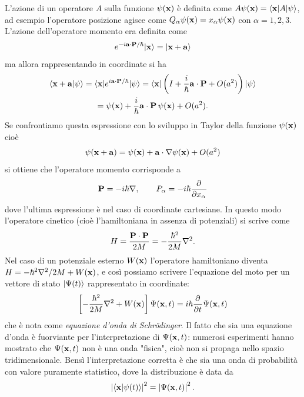 L'azione di un operatore $ A $ sulla funzione $ \psi(\mathbf{x}) $ è definita come $ A \psi(\mathbf{x}) = \langle \mathbf{x} | A | \psi \rangle $, ad esempio l'operatore posizione 
agisce come $ Q_\alpha \psi(\mathbf{x}) = x_\alpha \psi(\mathbf{x}) $ con $ \alpha = 1,2,3 $. L'azione dell'operatore momento era definita come 
\begin{align*}
  e^{- i \mathbf{a\cdot P} /\hbar } \vert \mathbf{x} \rangle = \vert \mathbf{x + a} \rangle
\end{align*}
ma allora rappresentando in coordinate si ha 
\begin{gather}
  \langle \mathbf{x + a} | \psi \rangle = \langle \mathbf{x} \vert e^{i\mathbf{a\cdot P} /\hbar } \vert \psi \rangle = \langle \mathbf{x} \vert\left(  I + \frac{i}\hbar \mathbf{a\cdot P} + O(a^2)\right) \vert \psi \rangle 
  \\
  = \psi(\mathbf{x}) + \frac{i}\hbar \mathbf{a\cdot P} \, \psi(\mathbf{x}) + O(a^2).
\end{gather}
Se confrontiamo questa espressione con lo sviluppo in Taylor della funzione $ \psi(\mathbf{x}) $ cioè 
\begin{align*}
  \psi(\mathbf{x + a}) =  \psi(\mathbf{x}) + \mathbf{a} \cdot \nabla \psi(\mathbf{x}) + O(a^2)
\end{align*}
si ottiene che l'operatore momento corrisponde a 
\begin{align*}
  \mathbf{P} = - i \hbar \nabla, \qquad P_\alpha = -i \hbar \frac{\partial^{} {}}{\partial {x_\alpha}^{}}
\end{align*}
dove l'ultima espressione è nel caso di coordinate cartesiane. In questo modo l'operatore cinetico (cioè l'hamiltoniana in assenza di potenziali) 
si scrive come 
\begin{align*}
  H = \frac{ \mathbf{P \cdot P}}{2M} = - \frac{\hbar^2}{2M} \nabla^2.
\end{align*}
Nel caso di un potenziale esterno $ W(\mathbf{x}) $ l'operatore hamiltoniano diventa $ H = -\hbar^2 \nabla^2/2M + W(\mathbf{x}) $, e così possiamo scrivere 
l'equazione del moto per un vettore di stato $ \vert \Psi(t) \rangle $ rappresentato in coordinate: 
\begin{align*}
  \left[ -\frac{\hbar^2}{2M} \nabla^2 + W(\mathbf{x}) \right] \Psi(\mathbf{x}, t) = i \hbar \frac{\partial^{} {}}{\partial {t}^{}}\Psi(\mathbf{x}, t) 
\end{align*}
che è nota come \textit{equazione d'onda di Schrödinger}. Il fatto che sia una equazione d'onda è fuorviante per l'interpretazione di $ \Psi(\mathbf{x}, t) $:
numerosi esperimenti hanno mostrato che $ \Psi(\mathbf{x}, t) $ non è una onda "fisica", cioè non si propaga nello spazio tridimensionale. Bensì 
l'interpretazione corretta è che sia una onda di probabilità con valore puramente statistico, dove la distribuzione è data da 
\begin{align*}
  \left|{\langle \mathbf{x} | \psi(t) \rangle}\right|^2 = \left|{ \Psi(\mathbf{x}, t)}\right|^2.
\end{align*}
